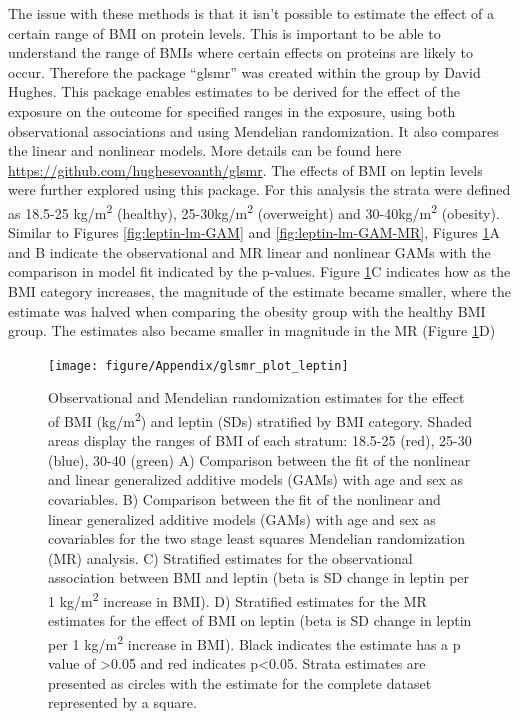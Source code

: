 \documentclass[11pt,twoside]{bristolthesis}
\begin{document}
The issue with these methods is that it isn't possible to estimate the effect of a certain range of BMI on protein levels. This is important to be able to understand the range of BMIs where certain effects on proteins are likely to occur. Therefore the package ``glsmr'' was created within the group by David Hughes. This package enables estimates to be derived for the effect of the exposure on the outcome for specified ranges in the exposure, using both observational associations and using Mendelian randomization. It also compares the linear and nonlinear models. More details can be found here \url{https://github.com/hughesevoanth/glsmr}. The effects of BMI on leptin levels were further explored using this package. For this analysis the strata were defined as 18.5-25 kg/m\textsuperscript{2} (healthy), 25-30kg/m\textsuperscript{2} (overweight) and 30-40kg/m\textsuperscript{2} (obesity). Similar to Figures \ref{fig:leptin-lm-GAM} and \ref{fig:leptin-lm-GAM-MR}, Figures \ref{fig:leptin-glsmr}A and B indicate the observational and MR linear and nonlinear GAMs with the comparison in model fit indicated by the p-values. Figure \ref{fig:leptin-glsmr}C indicates how as the BMI category increases, the magnitude of the estimate became smaller, where the estimate was halved when comparing the obesity group with the healthy BMI group. The estimates also became smaller in magnitude in the MR (Figure \ref{fig:leptin-glsmr}D)



\begin{figure}
\texttt{[image: figure/Appendix/glsmr\_plot\_leptin]} \caption[Observational and Mendelian randomization estimates for the effect of BMI and leptin stratified by BMI.]{Observational and Mendelian randomization estimates for the effect of BMI (kg/m\textsuperscript{2}) and leptin (SDs) stratified by BMI category. Shaded areas display the ranges of BMI of each stratum: 18.5-25 (red), 25-30 (blue), 30-40 (green) A) Comparison between the fit of the nonlinear and linear generalized additive models (GAMs) with age and sex as covariables. B) Comparison between the fit of the nonlinear and linear generalized additive models (GAMs) with age and sex as covariables for the two stage least squares Mendelian randomization (MR) analysis. C) Stratified estimates for the observational association between BMI and leptin (beta is SD change in leptin per 1 kg/m\textsuperscript{2} increase in BMI). D) Stratified estimates for the MR estimates for the effect of BMI on leptin (beta is SD change in leptin per 1 kg/m\textsuperscript{2} increase in BMI). Black indicates the estimate has a p value of \textgreater0.05 and red indicates p\textless0.05. Strata estimates are presented as circles with the estimate for the complete dataset represented by a square.}\label{fig:leptin-glsmr}
\end{figure}
\backmatter
\end{document}
